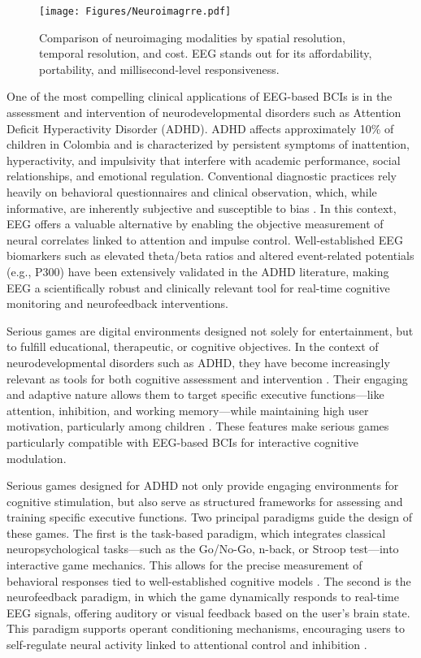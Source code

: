 \begin{figure}[h]
 \centering
 \texttt{[image: Figures/Neuroimagrre.pdf]}
 \caption{Comparison of neuroimaging modalities by spatial resolution, temporal resolution, and cost. EEG stands out for its affordability, portability, and millisecond-level responsiveness.}
 \label{fig:neuroimaging_comparison}
\end{figure}

One of the most compelling clinical applications of EEG-based BCIs is in the assessment and intervention of neurodevelopmental disorders such as Attention Deficit Hyperactivity Disorder (ADHD). ADHD affects approximately 10\% of children in Colombia \cite{salari2023global,pineda2003prevalence} and is characterized by persistent symptoms of inattention, hyperactivity, and impulsivity that interfere with academic performance, social relationships, and emotional regulation. Conventional diagnostic practices rely heavily on behavioral questionnaires and clinical observation, which, while informative, are inherently subjective and susceptible to bias \cite{raiker2017accuracy}. In this context, EEG offers a valuable alternative by enabling the objective measurement of neural correlates linked to attention and impulse control. Well-established EEG biomarkers such as elevated theta/beta ratios and altered event-related potentials (e.g., P300) have been extensively validated in the ADHD literature, making EEG a scientifically robust and clinically relevant tool for real-time cognitive monitoring and neurofeedback interventions.

Serious games are digital environments designed not solely for entertainment, but to fulfill educational, therapeutic, or cognitive objectives. In the context of neurodevelopmental disorders such as ADHD, they have become increasingly relevant as tools for both cognitive assessment and intervention \cite{Patino2025}. Their engaging and adaptive nature allows them to target specific executive functions—like attention, inhibition, and working memory—while maintaining high user motivation, particularly among children \cite{RodriguezTimana2024}. These features make serious games particularly compatible with EEG-based BCIs for interactive cognitive modulation.


Serious games designed for ADHD not only provide engaging environments for cognitive stimulation, but also serve as structured frameworks for assessing and training specific executive functions. Two principal paradigms guide the design of these games. The first is the task-based paradigm, which integrates classical neuropsychological tasks—such as the Go/No-Go, n-back, or Stroop test—into interactive game mechanics. This allows for the precise measurement of behavioral responses tied to well-established cognitive models \cite{Fang2025}. The second is the neurofeedback paradigm, in which the game dynamically responds to real-time EEG signals, offering auditory or visual feedback based on the user’s brain state. This paradigm supports operant conditioning mechanisms, encouraging users to self-regulate neural activity linked to attentional control and inhibition \cite{Firouzabadi2022}. 


